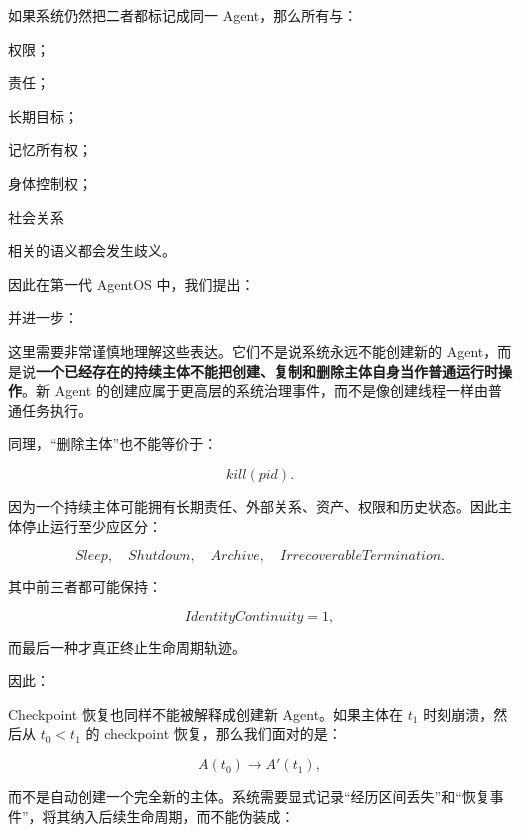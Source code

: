 如果系统仍然把二者都标记成同一 Agent，那么所有与：

权限；

责任；

长期目标；

记忆所有权；

身体控制权；

社会关系

相关的语义都会发生歧义。

因此在第一代 AgentOS 中，我们提出：

\begin{statementbox}
\centering
{}
\end{statementbox}

并进一步：

\begin{statementbox}
\centering
{}
\end{statementbox}

这里需要非常谨慎地理解这些表达。它们不是说系统永远不能创建新的 Agent，而是说\textbf{一个已经存在的持续主体不能把创建、复制和删除主体自身当作普通运行时操作}。新 Agent 的创建应属于更高层的系统治理事件，而不是像创建线程一样由普通任务执行。

同理，“删除主体”也不能等价于：

\[
kill(pid).
\]

因为一个持续主体可能拥有长期责任、外部关系、资产、权限和历史状态。因此主体停止运行至少应区分：

\[
Sleep,
\quad
Shutdown,
\quad
Archive,
\quad
IrrecoverableTermination.
\]

其中前三者都可能保持：

\[
IdentityContinuity=1,
\]

而最后一种才真正终止生命周期轨迹。

因此：

\begin{statementbox}
\centering
{}
\end{statementbox}

Checkpoint 恢复也同样不能被解释成创建新 Agent。如果主体在 $t_1$ 时刻崩溃，然后从 $t_0<t_1$ 的 checkpoint 恢复，那么我们面对的是：

\[
A(t_0)
\rightarrow
A'(t_1),
\]

而不是自动创建一个完全新的主体。系统需要显式记录“经历区间丢失”和“恢复事件”，将其纳入后续生命周期，而不能伪装成：

